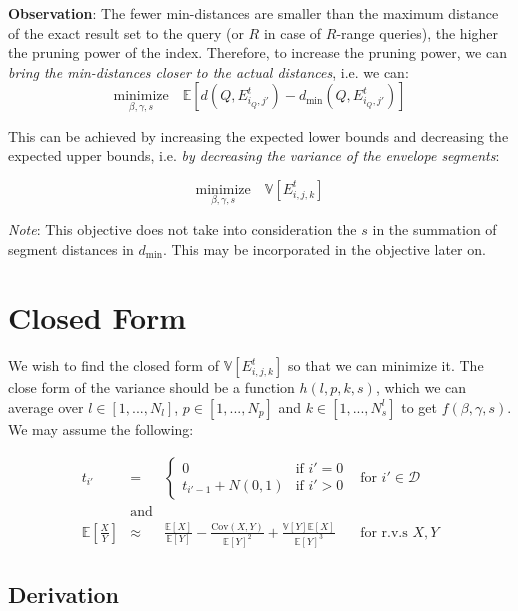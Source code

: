 \documentclass[12pt,a4paper]{article}
\newcommand{\expectation}[1]{\mathbb{E}\left[#1\right]} %
\newcommand{\variance}[1]{\mathbb{V}\left[#1\right]} %
\newcommand{\covariance}[2]{\text{Cov}(#1,#2)} %
\newcommand{\envelope}[4]{E_{#1,#2,#3}^{#4}} %
\newcommand{\envelopeijkt}{\envelope{i}{j}{k}{t}} %
\begin{document}
\textbf{Observation}: The fewer min-distances are smaller than the maximum distance of the exact result set to the query (or $R$ in case of $R$-range queries), the higher the pruning power of the index. Therefore, to increase the pruning power, we can \textit{bring the min-distances closer to the actual distances}, i.e. we can:
$$\underset{\beta,\gamma,s}{\text{minimize}}\quad \mathbb{E}\left[d\left(Q,E_{i_Q,j'}^t\right)-d_{\min}\left(Q,E_{i_Q,j'}^t\right)\right]$$

This can be achieved by increasing the expected lower bounds and decreasing the expected upper bounds, i.e. \textit{by decreasing the variance of the envelope segments}:

$$\underset{\beta,\gamma,s}{\text{minimize}}\quad\mathbb{V}\left[E_{i,j,k}^t\right]$$

\textit{Note}: This objective does not take into consideration the $s$ in the summation of segment distances in $d_{\min}$. This may be incorporated in the objective later on.

\section{Closed Form}

We wish to find the closed form of $\mathbb{V}\left[\envelopeijkt\right]$ so that we can minimize it. The close form of the variance should be a function $h(l,p,k,s)$, which we can average over $l\in[1,...,N_l]$, $p\in[1,...,N_p]$ and $k\in[1,...,N_s^l]$ to get $f(\beta,\gamma,s)$. We may assume the following:

$$
\begin{array}{rcll}
    t_{i'} & = & \begin{cases}
        0 & \text{if } i' = 0 \\
        t_{i'-1}+N(0,1) & \text{if } i' > 0
    \end{cases} & \text{for } i'\in\mathcal{D} \\[4pt]
    & \text{and} & \\[4pt]
    \expectation{\frac{X}{Y}} & \approx & \frac{\expectation{X}}{\expectation{Y}} - \frac{\covariance{X}{Y}}{\expectation{Y}^2} + \frac{\variance{Y}\expectation{X}}{\expectation{Y}^3} & \text{for r.v.s } X,Y
\end{array}
$$

\subsection{Derivation}
\end{document}
